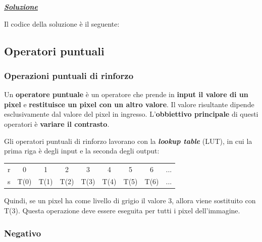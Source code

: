 \documentclass[a4paper]{article}
\begin{document}
	\noindent
	\textcolor{Green4}{\textbf{\emph{\underline{Soluzione}}}}\newline
	
	\noindent
	Il codice della soluzione è il seguente:
	\newpage
	
	\subsection{Operatori puntuali}
	
	\subsubsection{Operazioni puntuali di rinforzo}
	
	Un \textcolor{Red3}{\textbf{operatore puntuale}} è un operatore che prende in \textbf{input il valore di un pixel} e \textbf{restituisce un pixel con un altro valore}. Il valore risultante dipende esclusivamente dal valore del pixel in ingresso. L'\textbf{obbiettivo principale} di questi operatori è \textbf{variare il contrasto}.\newline
	
	\noindent
	Gli operatori puntuali di rinforzo lavorano con la \textbf{\emph{lookup table}} (LUT), in cui la prima riga è degli input e la seconda degli output:
	\begin{table}[!htp]
		\centering
		\begin{tabular}{@{} c | c | c | c | c | c | c | c | c @{}}
			\midrule
			\textcolor{Red3}{r}	& 0 & 1 & 2 & 3 & 4 & 5 & 6 & ... \\
			\textcolor{Red3}{s}	& T(0) & T(1) & T(2) & T(3) & T(4) & T(5) & T(6) & ... \\
			\bottomrule
		\end{tabular}
	\end{table}
	
	\noindent
	Quindi, se un pixel ha come livello di grigio il valore 3, allora viene sostituito con T(3). Questa operazione deve essere eseguita per tutti i pixel dell'immagine.\newpage
	
	\subsubsection{Negativo}
	
\end{document}
